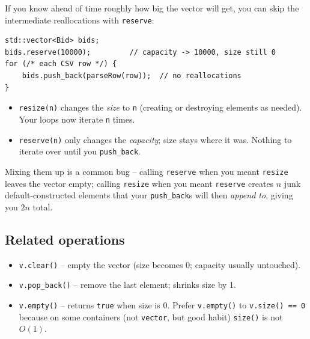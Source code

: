 \documentclass[11pt]{article}
\begin{document}
If you know ahead of time roughly how big the vector will get, you
can skip the intermediate reallocations with \texttt{reserve}:
\begin{lstlisting}
std::vector<Bid> bids;
bids.reserve(10000);         // capacity -> 10000, size still 0
for (/* each CSV row */) {
    bids.push_back(parseRow(row));  // no reallocations
}
\end{lstlisting}

\begin{warnbox}
\begin{itemize}
    \item \texttt{resize(n)} changes the \emph{size} to \texttt{n}
          (creating or destroying elements as needed). Your loops
          now iterate \texttt{n} times.
    \item \texttt{reserve(n)} only changes the \emph{capacity};
          size stays where it was. Nothing to iterate over until you
          \texttt{push\_back}.
\end{itemize}
Mixing them up is a common bug -- calling \texttt{reserve} when you
meant \texttt{resize} leaves the vector empty; calling
\texttt{resize} when you meant \texttt{reserve} creates $n$ junk
default-constructed elements that your \texttt{push\_back}s will
then \emph{append to}, giving you $2n$ total.
\end{warnbox}

\subsection{Related operations}

\begin{itemize}
    \item \texttt{v.clear()} -- empty the vector (size becomes 0;
          capacity usually untouched).
    \item \texttt{v.pop\_back()} -- remove the last element; shrinks
          size by 1.
    \item \texttt{v.empty()} -- returns \texttt{true} when size is
          0. Prefer \texttt{v.empty()} to \texttt{v.size() == 0}
          because on some containers (not \texttt{vector}, but good
          habit) \texttt{size()} is not $O(1)$.
\end{itemize}
\end{document}
